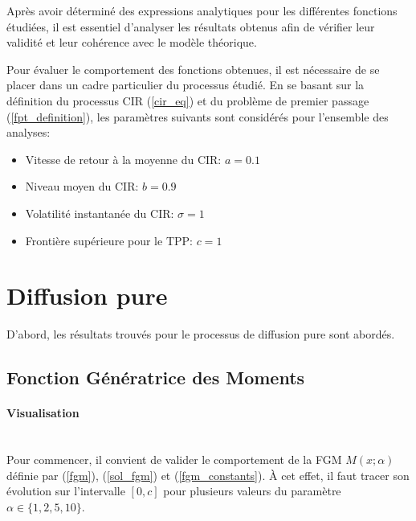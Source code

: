 \label{sec:Theme2}

Après avoir déterminé des expressions analytiques pour les différentes fonctions étudiées, il est essentiel d'analyser les résultats obtenus afin de vérifier leur validité et leur cohérence avec le modèle théorique. 

Pour évaluer le comportement des fonctions obtenues, il est nécessaire de se placer dans un cadre particulier du processus étudié. En se basant sur la définition du processus \acs{CIR} (\ref{cir_eq}) et du problème de premier passage (\ref{fpt_definition}), les paramètres suivants sont considérés pour l'ensemble des analyses:

\begin{itemize}
    \item Vitesse de retour à la moyenne du \acs{CIR}: $a=0.1$
    \item Niveau moyen du \acs{CIR}: $b=0.9$
    \item Volatilité instantanée du \acs{CIR}: $\sigma=1$
    \item Frontière supérieure pour le \acs{TPP}: $c=1$
\end{itemize}

\section{Diffusion pure}

D'abord, les résultats trouvés pour le processus de diffusion pure sont abordés.

\subsection{Fonction Génératrice des Moments}

\paragraph{Visualisation}\phantom{}\\
Pour commencer, il convient de valider le comportement de la \acl{FGM} $M(x;\alpha)$ définie par (\ref{fgm}), (\ref{sol_fgm}) et (\ref{fgm_constants}). À cet effet, il faut tracer son évolution sur l'intervalle $[0, c]$ pour plusieurs valeurs du paramètre $\alpha \in \{1, 2, 5, 10\}$. 


